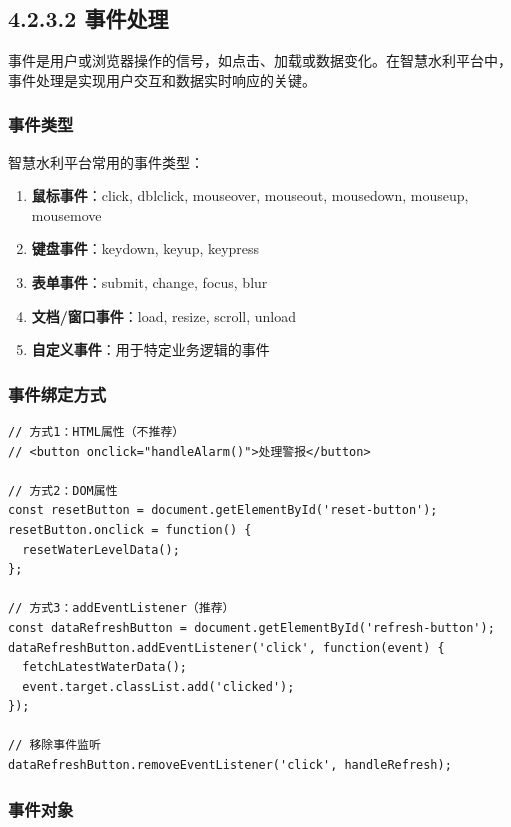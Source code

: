 \subsection{4.2.3.2 事件处理}\label{ux4e8bux4ef6ux5904ux7406}

事件是用户或浏览器操作的信号，如点击、加载或数据变化。在智慧水利平台中，事件处理是实现用户交互和数据实时响应的关键。

\subsubsection{事件类型}\label{ux4e8bux4ef6ux7c7bux578b}

智慧水利平台常用的事件类型：

\begin{enumerate}
\def\labelenumi{\arabic{enumi}.}
\tightlist
\item
  \textbf{鼠标事件}：click, dblclick, mouseover, mouseout, mousedown,
  mouseup, mousemove
\item
  \textbf{键盘事件}：keydown, keyup, keypress
\item
  \textbf{表单事件}：submit, change, focus, blur
\item
  \textbf{文档/窗口事件}：load, resize, scroll, unload
\item
  \textbf{自定义事件}：用于特定业务逻辑的事件
\end{enumerate}

\subsubsection{事件绑定方式}\label{ux4e8bux4ef6ux7ed1ux5b9aux65b9ux5f0f}

\begin{lstlisting}
// 方式1：HTML属性（不推荐）
// <button onclick="handleAlarm()">处理警报</button>

// 方式2：DOM属性
const resetButton = document.getElementById('reset-button');
resetButton.onclick = function() {
  resetWaterLevelData();
};

// 方式3：addEventListener（推荐）
const dataRefreshButton = document.getElementById('refresh-button');
dataRefreshButton.addEventListener('click', function(event) {
  fetchLatestWaterData();
  event.target.classList.add('clicked');
});

// 移除事件监听
dataRefreshButton.removeEventListener('click', handleRefresh);
\end{lstlisting}

\subsubsection{事件对象}\label{ux4e8bux4ef6ux5bf9ux8c61}

